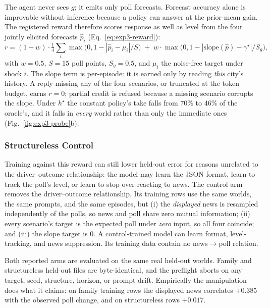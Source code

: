 The agent never sees $g$; it emits only poll forecasts. Forecast accuracy alone is
improvable without inference because a policy can answer at the prior-mean gain.
The registered reward therefore scores response as well as level from the four
jointly elicited forecasts $\hat p_i$ (Eq.~\eqref{eq:exp3-reward}):
\begin{equation}
r=(1-w)\cdot\tfrac14\sum_{i}\max\!\big(0,1-|\hat p_i-\mu_i|/S\big)\;+\;w\cdot\max\!\big(0,1-|\mathrm{slope}(\hat p)-\gamma^\star|/S_g\big),
\label{eq:exp3-reward}
\end{equation}
with $w{=}0.5$, $S{=}15$ poll points, $S_g{=}0.5$, and $\mu_i$ the noise-free target under shock $i$. The
slope term is per-episode: it is earned only by reading \emph{this} city's history. A reply missing any
of the four scenarios, or truncated at the token budget, earns $r{=}0$; partial credit is refused because
a missing scenario corrupts the slope. Under $h^\star$ the constant policy's take falls from $70\%$ to
$46\%$ of the oracle's, and it falls in \emph{every} world rather than only the immediate ones
(Fig.~\ref{fig:exp3-probe}b).

\subsubsection{Structureless Control}
\label{app:exp3-control}

Training against this reward can still lower held-out error for reasons unrelated to the
driver--outcome relationship: the model may learn the JSON format, learn to track the poll's level, or learn to stop over-reacting to news.
The control arm removes the driver--outcome relationship. Its training rows use the same
worlds, the same prompts, and the same episodes, but (i) the \emph{displayed} news is resampled
independently of the polls, so news and poll share zero mutual information; (ii) every scenario's target
is the expected poll under \emph{zero} input, so all four coincide; and (iii) the slope target is $0$. A
control-trained model can learn format, level-tracking, and news suppression. Its
training data contain no news$\to$poll relation.

Both reported arms are evaluated on the same real held-out worlds. Family and
structureless held-out files are byte-identical, and the preflight aborts on any
target, seed, structure, horizon, or prompt drift. Empirically the manipulation
does what it claims: on family training rows the displayed news correlates
$+0.385$ with the observed poll change, and on structureless rows $+0.017$.

